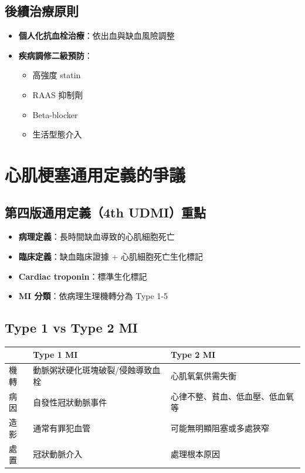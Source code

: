 \documentclass[12pt,a4paper]{article}
\begin{document}
\subsection{後續治療原則}

\begin{itemize}
    \item \textbf{個人化抗血栓治療}：依出血與缺血風險調整
    \item \textbf{疾病調修二級預防}：
    \begin{itemize}
        \item 高強度 statin
        \item RAAS 抑制劑
        \item Beta-blocker
        \item 生活型態介入
    \end{itemize}
\end{itemize}

\section{心肌梗塞通用定義的爭議}

\subsection{第四版通用定義（4th UDMI）重點}

\begin{itemize}
    \item \textbf{病理定義}：長時間缺血導致的心肌細胞死亡
    \item \textbf{臨床定義}：缺血臨床證據 + 心肌細胞死亡生化標記
    \item \textbf{Cardiac troponin}：標準生化標記
    \item \textbf{MI 分類}：依病理生理機轉分為 Type 1-5
\end{itemize}

\subsection{Type 1 vs Type 2 MI}

\begin{longtable}{p{2cm}p{6cm}p{6cm}}
\toprule
& \textbf{Type 1 MI} & \textbf{Type 2 MI} \\
\midrule
\endfirsthead
\bottomrule
\endfoot
機轉 & 動脈粥狀硬化斑塊破裂/侵蝕導致血栓 & 心肌氧氣供需失衡 \\
\midrule
病因 & 自發性冠狀動脈事件 & 心律不整、貧血、低血壓、低血氧等 \\
\midrule
造影 & 通常有罪犯血管 & 可能無明顯阻塞或多處狹窄 \\
\midrule
處置 & 冠狀動脈介入 & 處理根本原因 \\
\bottomrule
\end{longtable}
\end{document}
